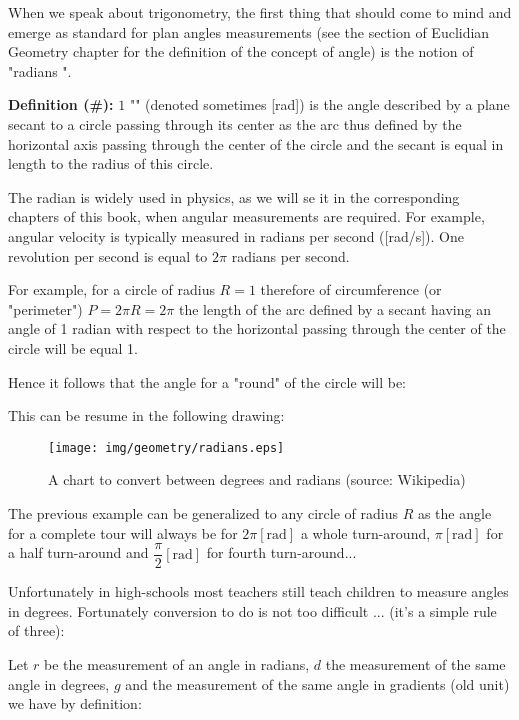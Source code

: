 	When we speak about trigonometry, the first thing that should come to mind and emerge as standard for plan angles measurements (see the section of Euclidian Geometry chapter for the definition of the concept of angle) is the notion of "radians ".

	\textbf{Definition (\#\mydef):} $1$ "" (denoted sometimes [rad]) is the angle described by a plane secant to a circle passing through its center as the arc thus defined by the horizontal axis passing through the center of the circle and the secant is equal in length to the radius of this circle.

	\begin{tcolorbox}[title=Remark,colframe=black,arc=10pt]
	The radian is widely used in physics, as we will se it in the corresponding chapters of this book, when angular measurements are required. For example, angular velocity is typically measured in radians per second ([rad/s]). One revolution per second is equal to $2\pi$ radians per second.
	\end{tcolorbox}
	
	For example, for a circle of radius $R=1$ therefore of circumference (or "perimeter") $P=2\pi R=2\pi$ the length of the arc defined by a secant having an angle of 1 radian with respect to the horizontal passing through the center of the circle will be equal 1.

	Hence it follows that the angle for a "round" of the circle will be:
	
	This can be resume in the following drawing:
	\begin{figure}[H]
		\centering
		\texttt{[image: img/geometry/radians.eps]}
		\caption{A chart to convert between degrees and radians (source: Wikipedia)}
	\end{figure}
	The previous example can be generalized to any circle of radius $R$ as the angle for a complete tour will always be for $2\pi [\text{rad}]$ a whole turn-around, $\pi [\text{rad}]$  for a half turn-around and $\dfrac{\pi}{2} [\text{rad}]$ for fourth turn-around...
	
	Unfortunately in high-schools most teachers still teach children to measure angles in degrees. Fortunately conversion to do is not too difficult ... (it's a simple rule of three):
		
	Let $r$ be the measurement of an angle in radians, $d$ the measurement of the same angle in degrees, $g$ and the measurement of the same angle in gradients (old unit) we have by definition:
	
